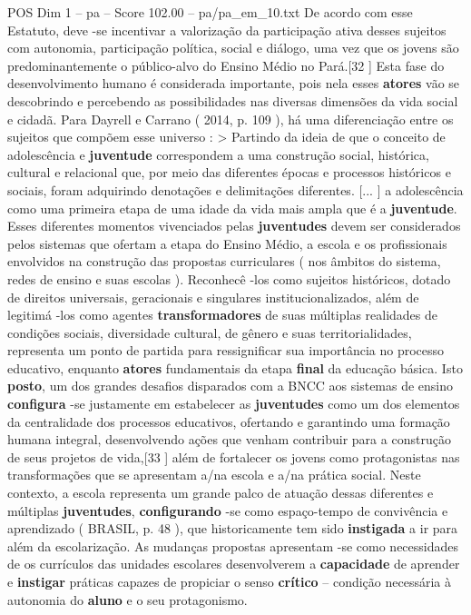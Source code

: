\begin{textsample}{POS Dim 1 – pa – Score 102.00 – pa/pa\_em\_10.txt}
De acordo com esse Estatuto, deve -se incentivar a valorização da participação ativa desses sujeitos com autonomia, participação política, social e diálogo, uma vez que os jovens são predominantemente o público-alvo do Ensino Médio no Pará.[32 ] Esta fase do desenvolvimento humano é considerada importante, pois nela esses \textbf{atores} vão se descobrindo e percebendo as possibilidades nas diversas dimensões da vida social e cidadã.
Para Dayrell e Carrano ( 2014, p. 109 ), há uma diferenciação entre os sujeitos que compõem esse universo : > Partindo da ideia de que o conceito de adolescência e \textbf{juventude} correspondem a uma construção social, histórica, cultural e relacional que, por meio das diferentes épocas e processos históricos e sociais, foram adquirindo denotações e delimitações diferentes. [... ] a adolescência como uma primeira etapa de uma idade da vida mais ampla que é a \textbf{juventude}.
Esses diferentes momentos vivenciados pelas \textbf{juventudes} devem ser considerados pelos sistemas que ofertam a etapa do Ensino Médio, a escola e os profissionais envolvidos na construção das propostas curriculares ( nos âmbitos do sistema, redes de ensino e suas escolas ).
Reconhecê -los como sujeitos históricos, dotado de direitos universais, geracionais e singulares institucionalizados, além de legitimá -los como agentes \textbf{transformadores} de suas múltiplas realidades de condições sociais, diversidade cultural, de gênero e suas territorialidades, representa um ponto de partida para ressignificar sua importância no processo educativo, enquanto \textbf{atores} fundamentais da etapa \textbf{final} da educação básica.
Isto \textbf{posto}, um dos grandes desafios disparados com a BNCC aos sistemas de ensino \textbf{configura} -se justamente em estabelecer as \textbf{juventudes} como um dos elementos da centralidade dos processos educativos, ofertando e garantindo uma formação humana integral, desenvolvendo ações que venham contribuir para a construção de seus projetos de vida,[33 ] além de fortalecer os jovens como protagonistas nas transformações que se apresentam a/na escola e a/na prática social.
Neste contexto, a escola representa um grande palco de atuação dessas diferentes e múltiplas \textbf{juventudes}, \textbf{configurando} -se como espaço-tempo de convivência e aprendizado ( BRASIL, p. 48 ), que historicamente tem sido \textbf{instigada} a ir para além da escolarização.
As mudanças propostas apresentam -se como necessidades de os currículos das unidades escolares desenvolverem a \textbf{capacidade} de aprender e \textbf{instigar} práticas capazes de propiciar o senso \textbf{crítico} – condição necessária à autonomia do \textbf{aluno} e o seu protagonismo.

\end{textsample}
